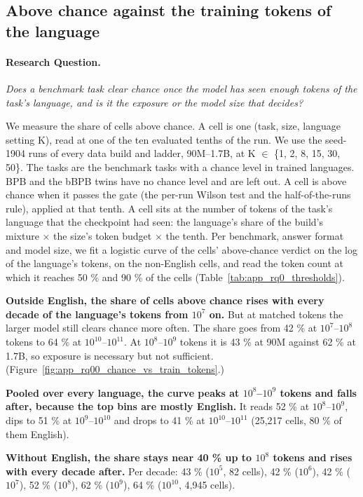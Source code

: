 \subsection{Above chance against the training tokens of the language}
\label{app:rq00_chance_vs_train_tokens}

\paragraph{Research Question.} \emph{Does a benchmark task clear chance once the model has seen enough tokens of the task's language, and is it the exposure or the model size that decides?}

We measure the share of cells above chance. A cell is one (task, size, language setting K), read at one of the ten evaluated tenths of the run. We use the seed-1904 runs of every data build and ladder, 90M--1.7B, at K $\in$ \{1, 2, 8, 15, 30, 50\}. The tasks are the benchmark tasks with a chance level in trained languages. BPB and the bBPB twins have no chance level and are left out. A cell is above chance when it passes the gate (the per-run Wilson test and the half-of-the-runs rule), applied at that tenth. A cell sits at the number of tokens of the task's language that the checkpoint had seen: the language's share of the build's mixture $\times$ the size's token budget $\times$ the tenth. Per benchmark, answer format and model size, we fit a logistic curve of the cells' above-chance verdict on the log of the language's tokens, on the non-English cells, and read the token count at which it reaches 50 \% and 90 \% of the cells (Table~\ref{tab:app_rq0_thresholds}). 

\textbf{Outside English, the share of cells above chance rises with every decade of the language's tokens from $10^{7}$ on.} But at matched tokens the larger model still clears chance more often. The share goes from 42 \% at $10^{7}$--$10^{8}$ tokens to 64 \% at $10^{10}$--$10^{11}$. At $10^{8}$--$10^{9}$ tokens it is 43 \% at 90M against 62 \% at 1.7B, so exposure is necessary but not sufficient. (Figure~\ref{fig:app_rq00_chance_vs_train_tokens}.)

\textbf{Pooled over every language, the curve peaks at $10^{8}$--$10^{9}$ tokens and falls after, because the top bins are mostly English.} It reads 52 \% at $10^{8}$--$10^{9}$, dips to 51 \% at $10^{9}$--$10^{10}$ and drops to 41 \% at $10^{10}$--$10^{11}$ (25,217 cells, 80 \% of them English).

\textbf{Without English, the share stays near 40 \% up to $10^{8}$ tokens and rises with every decade after.} Per decade: 43 \% ($10^{5}$, 82 cells), 42 \% ($10^{6}$), 42 \% ($10^{7}$), 52 \% ($10^{8}$), 62 \% ($10^{9}$), 64 \% ($10^{10}$, 4,945 cells).


